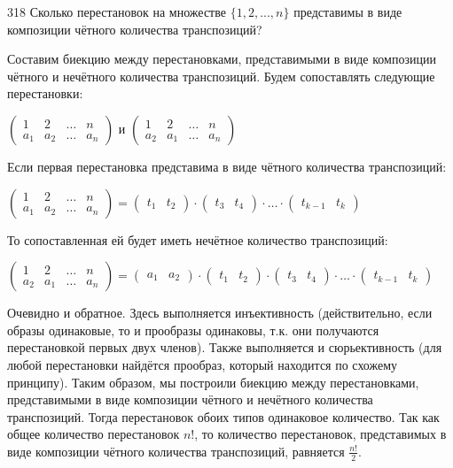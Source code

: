 \begin{task}{318}
Сколько перестановок на множестве $\{1, 2, ... , n\}$ представимы в виде композиции чётного количества транспозиций?
\end{task}

\begin{solution}
Составим биекцию между перестановками, представимыми в виде композиции чётного и нечётного количества транспозиций.
Будем сопоставлять следующие перестановки:
\begin{center}
$
\begin{pmatrix}
 1& 2& \ldots& n\\
 a_1& a_2& \ldots& a_n
\end{pmatrix}
$
и
$
\begin{pmatrix}
 1& 2& \ldots& n\\
 a_2& a_1& \ldots& a_n
\end{pmatrix}
$
\end{center}
Если первая перестановка представима в виде чётного количества транспозиций:
\begin{center}
$
\begin{pmatrix}
 1& 2& \ldots& n\\
 a_1& a_2& \ldots& a_n
\end{pmatrix}
=
\begin{pmatrix}
 t_1& t_2
\end{pmatrix}
\cdot
\begin{pmatrix}
 t_3& t_4
\end{pmatrix}
\cdot\ldots\cdot
\begin{pmatrix}
 t_{k-1}& t_k
\end{pmatrix}
$
\end{center}
То сопоставленная ей будет иметь нечётное количество транспозиций:
\begin{center}
$
\begin{pmatrix}
 1& 2& \ldots& n\\
 a_2& a_1& \ldots& a_n
\end{pmatrix}
=
\begin{pmatrix}
 a_1& a_2
\end{pmatrix}
\cdot
\begin{pmatrix}
 t_1& t_2
\end{pmatrix}
\cdot
\begin{pmatrix}
 t_3& t_4
\end{pmatrix}
\cdot\ldots\cdot
\begin{pmatrix}
 t_{k-1}& t_k
\end{pmatrix}
$
\end{center}
Очевидно и обратное. Здесь выполняется инъективность (действительно, если образы одинаковые, то и прообразы одинаковы, т.к. они получаются перестановкой первых двух членов). Также выполняется и сюрьективность (для любой перестановки найдётся прообраз, который находится по схожему принципу). Таким образом, мы построили биекцию между перестановками, представимыми в виде композиции чётного и нечётного количества транспозиций. Тогда перестановок обоих типов одинаковое количество. Так как общее количество перестановок $n!$, то количество перестановок, представимых в виде композиции чётного количества транспозиций, равняется $\frac{n!}{2}$.
\end{solution}